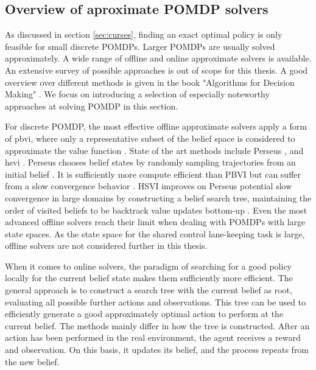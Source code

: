 \subsection{Overview of aproximate POMDP solvers}
\label{sec:solvers}

As discussed in section \ref{sec:curses}, finding an exact optimal policy is only feasible for small discrete POMDPs. Larger POMDPs are usually solved approximately. A wide range of offline and online approximate solvers is available. An extensive survey of possible approaches is out of scope for this thesis. A good overview over different methods is given in the book "Algorithms for Decision Making" \parencite{decision_making_book}. We focus on introducing a selection of especially noteworthy approaches at solving POMDP in this section.

For discrete POMDP, the most effective offline approximate solvers apply a form of \gls{pbvi}, where only a representative subset of the belief space is considered to approximate the value function \parencite{pomdp-point-based-value}. State of the art methods include Perseus \parencite{pomdp_perseus}, and \gls{hsvi} \parencite{solver_hsvi}. Perseus chooses belief states by randomly sampling trajectories from an initial belief \parencite{pomdp_perseus}. It is sufficiently more compute efficient than PBVI but can suffer from a slow convergence behavior \parencite{pbvi-survey}. HSVI improves on Perseus potential slow convergence in large domains by constructing a belief search tree, maintaining the order of visited beliefs to be backtrack value updates bottom-up \parencite{solver_hsvi}. Even the most advanced offline solvers reach their limit when dealing with POMDPs with large state spaces. As the state space for the shared control lane-keeping task is large, offline solvers are not considered further in this thesis. 

When it comes to online solvers, the paradigm of searching for a good policy locally for the current belief state makes them sufficiently more efficient. The general approach is to construct a search tree with the current belief as root, evaluating all possible further actions and observations. This tree can be used to efficiently generate a good approximately optimal action to perform at the current belief. The methods mainly differ in how the tree is constructed. After an action has been performed in the real environment, the agent receives a reward and observation. On this basis, it updates its belief, and the process repeats from the new belief. 

